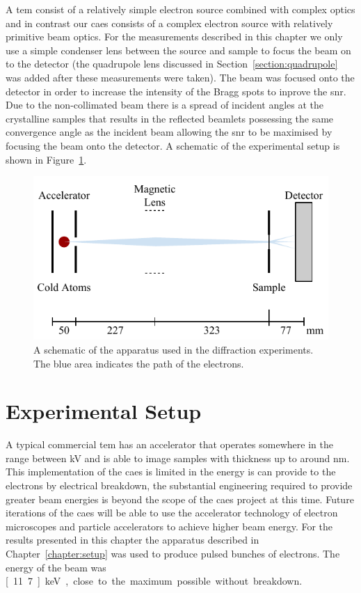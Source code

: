 A \gls{tem} consist of a relatively simple electron source combined with complex optics and in contrast our \gls{caes} consists of a complex electron source with relatively primitive beam optics.
For the measurements described in this chapter we only use a simple condenser lens between the source and sample to focus the beam on to the detector (the quadrupole lens discussed in Section~\ref{section:quadrupole} was added after these measurements were taken).
The beam was focused onto the detector in order to increase the intensity of the Bragg spots to inprove the \gls{snr}.
Due to the non-collimated beam there is a spread of incident angles at the crystalline samples that results in the reflected beamlets possessing the same convergence angle as the incident beam allowing the \gls{snr} to be maximised by focusing the beam onto the detector.
A schematic of the experimental setup is shown in Figure~\ref{figure:diffraction_geometry}.

\begin{figure}
    \center
    \includegraphics{part2/Figs/DiffractionGeometry.pdf}
    \caption[A schematic of the apparatus used for diffraction experiments.]{A schematic of the apparatus used in the diffraction experiments. The blue area indicates the path of the electrons.}
    \label{figure:diffraction_geometry}
\end{figure}

\section{Experimental Setup}

A typical commercial \gls{tem} has an accelerator that operates somewhere in the range between \unit[50-300]{kV} and is able to image samples with thickness up to around \unit[200]{nm}.
This implementation of the \gls{caes} is limited in the energy is can provide to the electrons by electrical breakdown, the substantial engineering required to provide greater beam energies is beyond the scope of the \gls{caes} project at this time.
Future iterations of the \gls{caes} will be able to use the accelerator technology of electron microscopes and particle accelerators to achieve higher beam energy.
For the results presented in this chapter the apparatus described in Chapter~\ref{chapter:setup} was used to produce pulsed bunches of electrons.
The energy of the beam was \unit[11.7]{keV}, close to the maximum possible without breakdown.

